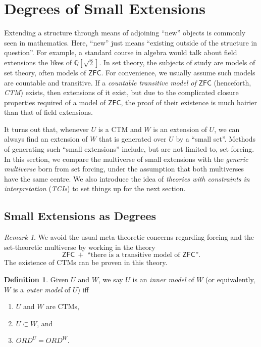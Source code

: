 \documentclass[12pt, twoside]{memoir}
\numberwithin{equation}{section}
\theoremstyle{definition}
\newtheorem{defi}[thm]{Definition}
\theoremstyle{remark}
\newtheorem{rem}[thm]{Remark}
\theoremstyle{definition}
\theoremstyle{definition}
\theoremstyle{definition}
\theoremstyle{remark}
\begin{document}
\section{Degrees of Small Extensions}\label{sect3}

Extending a structure through means of adjoining ``new'' objects is commonly seen in mathematics. Here, ``new'' just means ``existing outside of the structure in question''. For example, a standard course in algebra would talk about field extensions the likes of $\mathbb{Q}[\sqrt{2}]$. In set theory, the subjects of study are models of set theory, often models of $\mathsf{ZFC}$. For convenience, we usually assume such models are countable and transitive. If a \emph{countable transitive model of} $\mathsf{ZFC}$ (henceforth, \emph{CTM}) exists, then extensions of it exist, but due to the complicated closure properties required of a model of $\mathsf{ZFC}$, the proof of their existence is much hairier than that of field extensions. 

It turns out that, whenever $U$ is a CTM and $W$ is an extension of $U$, we can always find an extension of $W$ that is generated over $U$ by a ``small set''. Methods of generating such ``small extensions'' include, but are not limited to, set forcing. In this section, we compare the multiverse of small extensions with the \emph{generic multiverse} born from set forcing, under the assumption that both multiverses have the same centre. We also introduce the idea of \emph{theories with constraints in interpretation} (\emph{TCIs}) to set things up for the next section. 

\subsection{Small Extensions as Degrees}

\begin{rem}
We avoid the usual meta-theoretic concerns regarding forcing and the set-theoretic multiverse by working in the theory 
\begin{equation*}
    \mathsf{ZFC} \ + \text{ ``there is a transitive model of } \mathsf{ZFC}\text{''.}
\end{equation*} 
The existence of CTMs can be proven in this theory.
\end{rem}

\begin{defi}
Given $U$ and $W$, we say $U$ is an \emph{inner model} of $W$ (or equivalently, $W$ is a \emph{outer model} of $U$) iff
\begin{enumerate}[label=(\alph*)]
    \item $U$ and $W$ are CTMs,
    \item $U \subset W$, and
    \item $ORD^U = ORD^W$.
\end{enumerate}
\end{defi}
\end{document}
